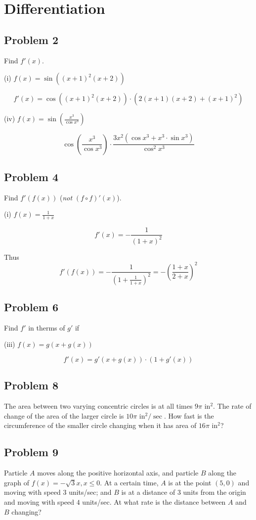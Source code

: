 
\section{Differentiation}

\subsection*{Problem 2}
Find $f'(x)$.

\vs

(i) $f(x)=\sin((x+1)^2(x+2))$

\[f'(x)=\cos((x+1)^2(x+2))\cdot(2(x+1)(x+2)+(x+1)^2)\]

\vs

(iv) $f(x)=\sin\left(\frac{x^3}{\cos x^3}\right)$

\[\cos\left(\frac{x^3}{\cos x^3}\right)\cdot \frac{3x^2(\cos x^3+x^3\cdot \sin
    x^3)}{\cos^2 x^3}\]


\subsection*{Problem 4}
Find $f'(f(x))$ (\textit{not} $(f\circ f)'(x)$).

\vs

(i) $f(x)=\frac{1}{1+x}$

\[f'(x)=-\frac{1}{(1+x)^2}\]

Thus
\[f'(f(x))=-\frac{1}{(1+\frac{1}{1+x})^2}=-\left(\frac{1+x}{2+x}\right)^2\]

\subsection*{Problem 6}
Find $f'$ in therms of $g'$ if

\vs

(iii) $f(x)=g(x+g(x))$

\[f'(x)=g'(x+g(x))\cdot (1+g'(x))\]

\subsection*{Problem 8}
The area between two varying concentric circles is at all times $9\pi$
in$^{2}$. The rate of change of the area of the larger circle is
$10\pi$ in$^2/\sec$. How fast is the circumference of the smaller circle
changing when it has area of $16\pi$ in$^2$?

\subsection*{Problem 9}
Particle $A$ moves along the positive horizontal axis, and particle
$B$ along the graph of $f(x)=-\sqrt{3}x,x\leq0$. At a certain time,
$A$ is at the point $(5,0)$ and moving with speed $3$ units/sec; and
$B$ is at a distance of 3 units from the origin and moving with speed
$4$ units/sec. At what rate is the distance between $A$ and $B$
changing?

